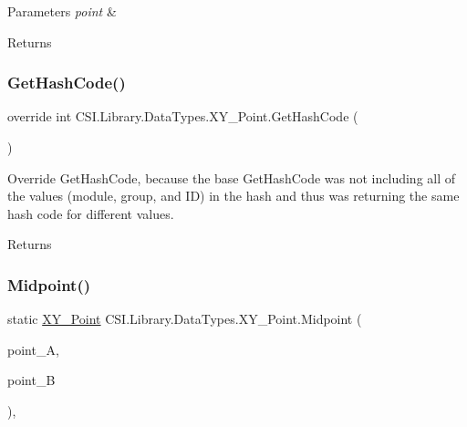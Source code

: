 \begin{DoxyParams}{Parameters}
{\em point} & \\
\hline
\end{DoxyParams}
\begin{DoxyReturn}{Returns}

\end{DoxyReturn}
\mbox{\label{struct_c_s_i_1_1_library_1_1_data_types_1_1_x_y___point_a4045c0fed4429382dcec3835b3ff626c}} 
\subsubsection{\texorpdfstring{GetHashCode()}{GetHashCode()}}
{\footnotesize\ttfamily override int C\+S\+I.\+Library.\+Data\+Types.\+X\+Y\+\_\+\+Point.\+Get\+Hash\+Code (\begin{DoxyParamCaption}{ }\end{DoxyParamCaption})\hspace{0.3cm}{\ttfamily [inline]}}



Override Get\+Hash\+Code, because the base Get\+Hash\+Code was not including all of the values (module, group, and ID) in the hash and thus was returning the same hash code for different values. 

\begin{DoxyReturn}{Returns}

\end{DoxyReturn}
\mbox{\label{struct_c_s_i_1_1_library_1_1_data_types_1_1_x_y___point_adae695175aa2738a5e0b4e06cc010caf}} 
\subsubsection{\texorpdfstring{Midpoint()}{Midpoint()}}
{\footnotesize\ttfamily static \mbox{\hyperlink{struct_c_s_i_1_1_library_1_1_data_types_1_1_x_y___point}{X\+Y\+\_\+\+Point}} C\+S\+I.\+Library.\+Data\+Types.\+X\+Y\+\_\+\+Point.\+Midpoint (\begin{DoxyParamCaption}\item[{\mbox{\hyperlink{struct_c_s_i_1_1_library_1_1_data_types_1_1_x_y___point}{X\+Y\+\_\+\+Point}}}]{point\+\_\+A,  }\item[{\mbox{\hyperlink{struct_c_s_i_1_1_library_1_1_data_types_1_1_x_y___point}{X\+Y\+\_\+\+Point}}}]{point\+\_\+B }\end{DoxyParamCaption})\hspace{0.3cm}{\ttfamily [inline]}, {\ttfamily [static]}}



